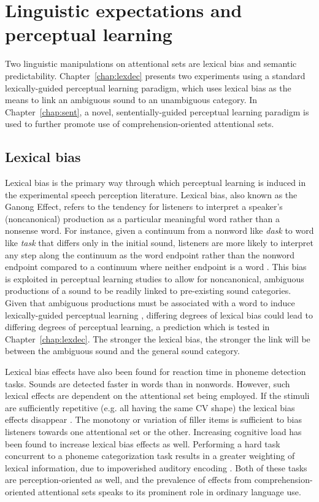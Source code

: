 \section{Linguistic expectations and perceptual learning}
\label{sec:linguistic}

Two linguistic manipulations on attentional sets are lexical bias and semantic predictability.
Chapter~\ref{chap:lexdec} presents two experiments using a standard lexically-guided perceptual learning paradigm, which uses lexical bias as the means to link an ambiguous sound to an unambiguous category.
In Chapter~\ref{chap:sent}, a novel, sententially-guided perceptual learning paradigm is used to further promote use of comprehension-oriented attentional sets.

\subsection{Lexical bias}
\label{sec:lexicalbias}

Lexical bias is the primary way through which perceptual learning is induced in the experimental speech perception literature.
Lexical bias, also known as the Ganong Effect, refers to the tendency for listeners to interpret a speaker's (noncanonical) production as a particular meaningful word rather than a nonsense word.  
For instance, given a continuum from a nonword like \emph{dask} to word like \emph{task} that differs only in the initial sound, listeners are more likely to interpret any step along the continuum as the word endpoint rather than the nonword endpoint compared to a continuum where neither endpoint is a word \citep{Ganong1980}. 
This bias is exploited in perceptual learning studies to allow for noncanonical, ambiguous productions of a sound to be readily linked to pre-existing sound categories.
Given that ambiguous productions must be associated with a word to induce lexically-guided perceptual learning \citep{Norris2003}, differing degrees of lexical bias could lead to differing degrees of perceptual learning, a prediction which is tested in Chapter~\ref{chap:lexdec}.  
The stronger the lexical bias, the stronger the link will be between the ambiguous sound and the general sound category.

Lexical bias effects have also been found for reaction time in phoneme detection tasks.
Sounds are detected faster in words than in nonwords.  However, such lexical effects are dependent on the attentional set being employed.  
If the stimuli are sufficiently repetitive (e.g. all having the same CV shape) the lexical bias effects disappear \citep{Cutler1987}.  
The monotony or variation of filler items is sufficient to bias listeners towards one attentional set or the other.
Increasing cognitive load has been found to increase lexical bias effects as well.
Performing a hard task concurrent to a phoneme categorization task results in a greater weighting of lexical information, due to impoverished auditory encoding \citep{Mattys2011}.
Both of these tasks are perception-oriented as well, and the prevalence of effects from comprehension-oriented attentional sets speaks to its prominent role in ordinary language use.

